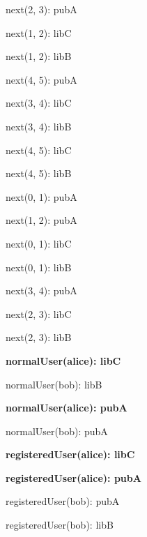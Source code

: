 \documentclass{article}
\newenvironment{states}
        {\begin{minipage}{\tableWidth}\raggedright\begin{description}[align=left,leftmargin=1em,noitemsep,labelsep=\parindent]}
        {\end{description}\end{minipage}}
\begin{document}
{\begin{states}
\item{{next(\allowbreak{}2, 3): pubA}}
\item{{next(\allowbreak{}1, 2): libC}}
\item{{next(\allowbreak{}1, 2): libB}}
\item{{next(\allowbreak{}4, 5): pubA}}
\item{{next(\allowbreak{}3, 4): libC}}
\item{{next(\allowbreak{}3, 4): libB}}
\item{{next(\allowbreak{}4, 5): libC}}
\item{{next(\allowbreak{}4, 5): libB}}
\item{{next(\allowbreak{}0, 1): pubA}}
\item{{next(\allowbreak{}1, 2): pubA}}
\item{{next(\allowbreak{}0, 1): libC}}
\item{{next(\allowbreak{}0, 1): libB}}
\item{{next(\allowbreak{}3, 4): pubA}}
\item{{next(\allowbreak{}2, 3): libC}}
\item{{next(\allowbreak{}2, 3): libB}}
\item\textbf{{normalUser(\allowbreak{}alice): libC}}
\item{{normalUser(\allowbreak{}bob): libB}}
\item\textbf{{normalUser(\allowbreak{}alice): pubA}}
\item{{normalUser(\allowbreak{}bob): pubA}}
\item\textbf{{registeredUser(\allowbreak{}alice): libC}}
\item\textbf{{registeredUser(\allowbreak{}alice): pubA}}
\item{{registeredUser(\allowbreak{}bob): pubA}}
\item{{registeredUser(\allowbreak{}bob): libB}}
\end{states}}
\end{document}
